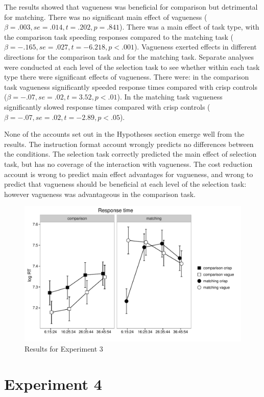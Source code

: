 \documentclass[
a4paper 
, doc
, longtable
]{apa6}
\begin{document}
The results showed that vagueness was beneficial for comparison but detrimental for matching. There was no significant main effect of vagueness ($\beta =.003, se=.014, t=.202, p=.841$). There was a main effect of task type, with the comparison task speeding responses compared to the matching task ($\beta=-.165, se=.027, t=-6.218, p<.001$). Vagueness exerted effects in different directions for the comparison task and for the matching task. Separate analyses were conducted at each level of the selection task to see whether within each task type there were significant effects of vagueness. There were: in the comparison task vagueness significantly speeded response times compared with crisp controls ($\beta=-.07, se=.02, t=3.52, p<.01$). In the matching task vagueness significantly slowed response times compared with crisp controls ($\beta=-.07, se=.02, t=-2.89, p<.05$).

None of the accounts set out in the Hypotheses section emerge well from the results. The instruction format account wrongly predicts no differences between the conditions. The selection task correctly predicted the main effect of selection task, but has no coverage of the interaction with vagueness. The cost reduction account is wrong to predict main effect advantages for vagueness, and wrong to predict that vagueness should be beneficial at each level of the selection task: however vagueness was advantageous in the comparison task.


\begin{figure}[htbp]
\centering
\includegraphics[width=.75\textwidth]{images/response-time-two-panels-1.pdf}
\caption{Results for Experiment 3}
\label{resultse3}
\end{figure}



\section{Experiment 4}
\end{document}
